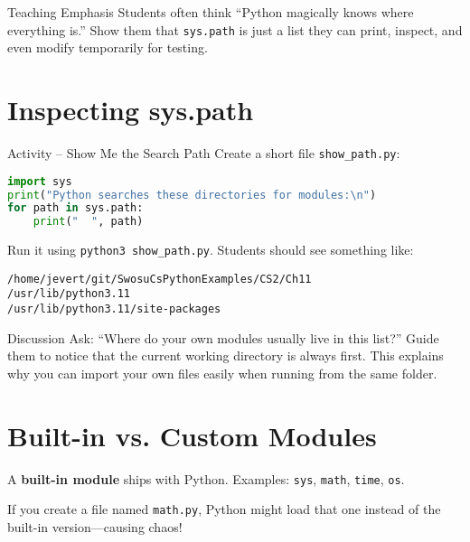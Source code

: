 \documentclass[12pt]{article}
\begin{document}
\begin{teacherbox}{Teaching Emphasis}
Students often think “Python magically knows where everything is.”  
Show them that \texttt{sys.path} is just a list they can print, inspect, and even modify temporarily for testing.
\end{teacherbox}

\section{Inspecting sys.path}

\begin{activitybox}{Activity – Show Me the Search Path}
Create a short file \texttt{show\_path.py}:

\begin{lstlisting}[language=Python]
import sys
print("Python searches these directories for modules:\n")
for path in sys.path:
    print("  ", path)
\end{lstlisting}

Run it using \texttt{python3 show\_path.py}.  
Students should see something like:
\begin{lstlisting}
/home/jevert/git/SwosuCsPythonExamples/CS2/Ch11
/usr/lib/python3.11
/usr/lib/python3.11/site-packages
\end{lstlisting}
\end{activitybox}

\begin{teacherbox}{Discussion}
Ask: “Where do your own modules usually live in this list?”  
Guide them to notice that the current working directory is always first.  
This explains why you can import your own files easily when running from the same folder.
\end{teacherbox}

\section{Built-in vs. Custom Modules}

A \textbf{built-in module} ships with Python.  
Examples: \texttt{sys}, \texttt{math}, \texttt{time}, \texttt{os}.  

If you create a file named \texttt{math.py}, Python might load that one instead of the built-in version—causing chaos!
\end{document}
